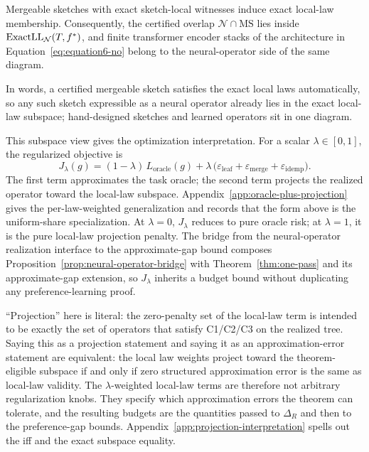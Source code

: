 \begin{proposition}\label{prop:law-constrained-no}
Mergeable sketches with exact sketch-local witnesses induce exact
local-law membership. Consequently, the certified overlap
$\mathcal{N}\cap\mathrm{MS}$ lies inside
$\mathrm{ExactLL}_{\mathcal{N}}(T,f^\ast)$, and finite transformer
encoder stacks of the architecture in Equation~\eqref{eq:equation6-no}
belong to the neural-operator side of the same diagram.
\end{proposition}

In words, a certified mergeable sketch satisfies the exact local laws
automatically, so any such sketch expressible as a neural operator
already lies in the exact local-law subspace; hand-designed sketches and
learned operators sit in one diagram.

This subspace view gives the optimization interpretation. For a scalar
$\lambda\in[0,1]$, the regularized objective is
\begin{equation}\label{eq:oracle-projection-objective}
J_\lambda(g)
  =
  (1-\lambda)\,L_{\mathrm{oracle}}(g)
  +
  \lambda\,\big(
    \varepsilon_{\mathrm{leaf}}
    + \varepsilon_{\mathrm{merge}}
    + \varepsilon_{\mathrm{idemp}}
  \big).
\end{equation}
The first term approximates the task oracle; the second term projects the
realized operator toward the local-law subspace. Appendix~\ref{app:oracle-plus-projection}
gives the per-law-weighted generalization and records that the form
above is the uniform-share specialization. At $\lambda=0$, $J_\lambda$
reduces to pure oracle risk; at $\lambda=1$, it is the pure local-law
projection penalty. The bridge from the neural-operator realization
interface to the approximate-gap bound composes
Proposition~\ref{prop:neural-operator-bridge} with
Theorem~\ref{thm:one-pass} and its approximate-gap extension, so
$J_\lambda$ inherits a budget bound without duplicating any
preference-learning proof.

``Projection'' here is literal: the zero-penalty set
of the local-law term is intended to be exactly the set of operators that
satisfy C1/C2/C3 on the realized tree. Saying this as a projection statement
and saying it as an approximation-error statement are equivalent: the local
law weights project toward the theorem-eligible subspace if and only if
zero structured approximation error is the same as local-law validity.
The $\lambda$-weighted local-law terms are therefore not
arbitrary regularization knobs. They specify which approximation errors
the theorem can tolerate, and the resulting budgets are the quantities
passed to $\Delta_R$ and then to the preference-gap bounds. Appendix~\ref{app:projection-interpretation}
spells out the iff and the exact subspace equality.

